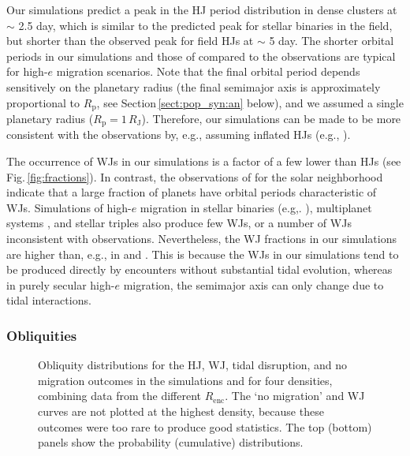 \documentclass[iop,usenatbib]{emulateapj}
\renewcommand{\S}{Section}
\newcommand{\F}{Fig.}
\newcommand{\renc}{R_\mathrm{enc}}
\begin{document}
Our simulations predict a peak in the HJ period distribution in dense clusters at $\sim$ 2.5 day, which is similar to the predicted peak for stellar binaries in the field, but shorter than the observed peak for field HJs at $\sim$ 5 day. The shorter orbital periods in our simulations and those of \citet{2016MNRAS.456.3671A} compared to the observations are typical for high-$e$ migration scenarios. Note that the final orbital period depends sensitively on the planetary radius (the final semimajor axis is approximately proportional to $R_\mathrm{p}$, see \S\,\ref{sect:pop_syn:an} below), and we assumed a single planetary radius ($R_\mathrm{p} = 1 \, R_\mathrm{J}$). Therefore, our simulations can be made to be more consistent with the observations by, e.g., assuming inflated HJs (e.g., \citealt{2011ApJ...729L...7L}).

The occurrence of WJs in our simulations is a factor of a few lower than HJs (see \F\,\ref{fig:fractions}). In contrast, the observations of \citet{2016A&A...587A..64S} for the solar neighborhood indicate that a large fraction of planets have orbital periods characteristic of WJs. Simulations of high-$e$ migration in stellar binaries (e.g,. \citealt{2016ApJ...829..132P,2016AJ....152..174A}), multiplanet systems \citep{2017MNRAS.464..688H}, and stellar triples \citep{2017MNRAS.466.4107H} also produce few WJs, or a number of WJs inconsistent with observations. Nevertheless, the WJ fractions in our simulations are higher than, e.g., in \citet{2017MNRAS.464..688H} and \citep{2017MNRAS.466.4107H}. This is because the WJs in our simulations tend to be produced directly by encounters without substantial tidal evolution, whereas in purely secular high-$e$ migration, the semimajor axis can only change due to tidal interactions.



\subsubsection{Obliquities}
\label{sect:pop_syn:obl}

\begin{figure}
\center
\iftoggle{ApJFigs}{
\texttt{[image: stellar\_obliquities\_run05.eps]}
\texttt{[image: stellar\_obliquities\_CDF\_run05.eps]}
}{
\texttt{[image: figs/stellar\_obliquities\_run05.eps]}
\texttt{[image: figs/stellar\_obliquities\_CDF\_run05.eps]}
}
\caption {Obliquity distributions for the HJ, WJ, tidal disruption, and no migration outcomes in the simulations and for four densities, combining data from the different $\renc$. The `no migration' and WJ curves are not plotted at the highest density, because these outcomes were too rare to produce good statistics. The top (bottom) panels show the probability (cumulative) distributions. }
\label{fig:stellar_obliquities}
\end{figure}
\end{document}
